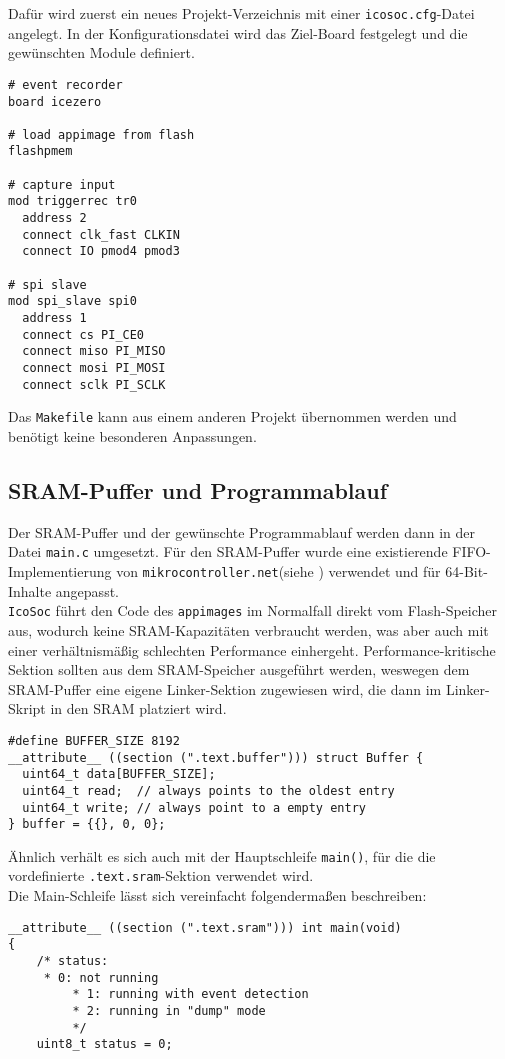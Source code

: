 {Dafür wird zuerst ein neues Projekt-Verzeichnis mit einer {\tt icosoc.cfg}-Datei angelegt. In der Konfigurationsdatei wird das Ziel-Board festgelegt und die gewünschten Module definiert.
\begin{verbatim}
# event recorder 
board icezero

# load appimage from flash
flashpmem

# capture input
mod triggerrec tr0
  address 2
  connect clk_fast CLKIN
  connect IO pmod4 pmod3

# spi slave
mod spi_slave spi0
  address 1
  connect cs PI_CE0
  connect miso PI_MISO
  connect mosi PI_MOSI
  connect sclk PI_SCLK
\end{verbatim}

Das {\tt Makefile} kann aus einem anderen Projekt übernommen werden und benötigt keine besonderen Anpassungen.\\

\subsection{SRAM-Puffer und Programmablauf}

Der SRAM-Puffer und der gewünschte Programmablauf werden dann in der Datei {\tt main.c} umgesetzt.
Für den SRAM-Puffer wurde eine existierende FIFO-Implementierung von {\tt mikrocontroller.net}(siehe \cite{web:mikro_fifo}) verwendet und für 64-Bit-Inhalte angepasst.\\
{\tt IcoSoc} führt den Code des {\tt appimages} im Normalfall direkt vom Flash-Speicher aus, wodurch keine SRAM-Kapazitäten verbraucht werden, was aber auch mit einer verhältnismäßig schlechten Performance einhergeht. Performance-kritische Sektion sollten aus dem SRAM-Speicher ausgeführt werden, weswegen dem SRAM-Puffer eine eigene Linker-Sektion zugewiesen wird, die dann im Linker-Skript in den SRAM platziert wird.
\begin{verbatim}
#define BUFFER_SIZE 8192 
__attribute__ ((section (".text.buffer"))) struct Buffer {
  uint64_t data[BUFFER_SIZE];
  uint64_t read;  // always points to the oldest entry
  uint64_t write; // always point to a empty entry
} buffer = {{}, 0, 0};
\end{verbatim}
 
Ähnlich verhält es sich auch mit der Hauptschleife {\tt main()}, für die die vordefinierte {\tt .text.sram}-Sektion verwendet wird.\\
Die Main-Schleife lässt sich vereinfacht folgendermaßen beschreiben:
\begin{verbatim}
__attribute__ ((section (".text.sram"))) int main(void) 
{
	/* status:
	 * 0: not running
         * 1: running with event detection
         * 2: running in "dump" mode
         */
	uint8_t status = 0; 
	

\end{verbatim}}
